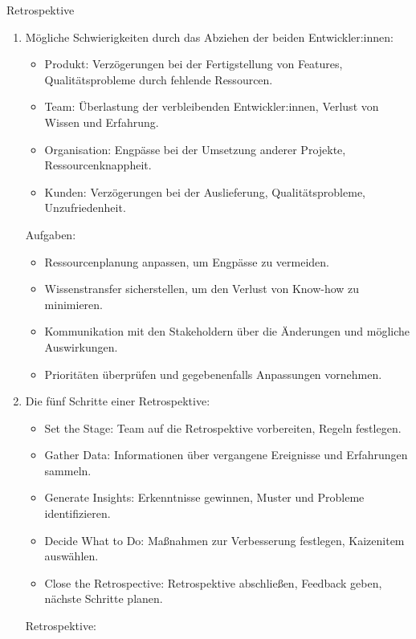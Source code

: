 \documentclass{article}
\begin{document}
\begin{exercise}{Retrospektive}
  \begin{solution}
    \begin{enumerate}
      \item Mögliche Schwierigkeiten durch das Abziehen der beiden Entwickler:innen:
            \begin{itemize}
              \item Produkt: Verzögerungen bei der Fertigstellung von Features, Qualitätsprobleme durch fehlende Ressourcen.
              \item Team: Überlastung der verbleibenden Entwickler:innen, Verlust von Wissen und Erfahrung.
              \item Organisation: Engpässe bei der Umsetzung anderer Projekte, Ressourcenknappheit.
              \item Kunden: Verzögerungen bei der Auslieferung, Qualitätsprobleme, Unzufriedenheit.
            \end{itemize}
            Aufgaben:
            \begin{itemize}
              \item Ressourcenplanung anpassen, um Engpässe zu vermeiden.
              \item Wissenstransfer sicherstellen, um den Verlust von Know-how zu minimieren.
              \item Kommunikation mit den Stakeholdern über die Änderungen und mögliche Auswirkungen.
              \item Prioritäten überprüfen und gegebenenfalls Anpassungen vornehmen.
            \end{itemize}
      \item Die fünf Schritte einer Retrospektive:
            \begin{itemize}
              \item Set the Stage: Team auf die Retrospektive vorbereiten, Regeln festlegen.
              \item Gather Data: Informationen über vergangene Ereignisse und Erfahrungen sammeln.
              \item Generate Insights: Erkenntnisse gewinnen, Muster und Probleme identifizieren.
              \item Decide What to Do: Maßnahmen zur Verbesserung festlegen, Kaizenitem auswählen.
              \item Close the Retrospective: Retrospektive abschließen, Feedback geben, nächste Schritte planen.
            \end{itemize}
            Retrospektive:
            \begin{itemize}

\end{itemize}
\end{enumerate}
\end{solution}
\end{exercise}
\end{document}
